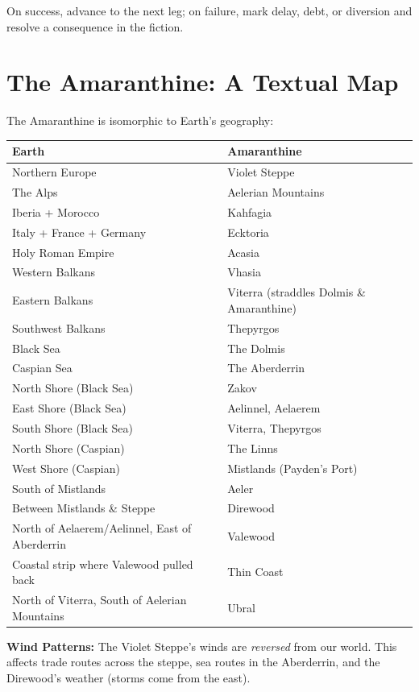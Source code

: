 \documentclass[11pt,letterpaper,twoside]{book}
\begin{document}
On success, advance to the next leg; on failure, mark delay, debt, or diversion and resolve a consequence in the fiction.

\section{The Amaranthine: A Textual Map}

The Amaranthine is isomorphic to Earth's geography:

\begin{center}
\begin{tabular}{|l|l|}
\hline
\textbf{Earth} & \textbf{Amaranthine} \\
\hline
Northern Europe & Violet Steppe \\
The Alps & Aelerian Mountains \\
Iberia + Morocco & Kahfagia \\
Italy + France + Germany & Ecktoria \\
Holy Roman Empire & Acasia \\
Western Balkans & Vhasia \\
Eastern Balkans & Viterra (straddles Dolmis \& Amaranthine) \\
Southwest Balkans & Thepyrgos \\
Black Sea & The Dolmis \\
Caspian Sea & The Aberderrin \\
North Shore (Black Sea) & Zakov \\
East Shore (Black Sea) & Aelinnel, Aelaerem \\
South Shore (Black Sea) & Viterra, Thepyrgos \\
North Shore (Caspian) & The Linns \\
West Shore (Caspian) & Mistlands (Payden's Port) \\
South of Mistlands & Aeler \\
Between Mistlands \& Steppe & Direwood \\
North of Aelaerem/Aelinnel, East of Aberderrin & Valewood \\
Coastal strip where Valewood pulled back & Thin Coast \\
North of Viterra, South of Aelerian Mountains & Ubral \\
\hline
\end{tabular}
\end{center}

\textbf{Wind Patterns:} The Violet Steppe's winds are \emph{reversed} from our world. This affects trade routes across the steppe, sea routes in the Aberderrin, and the Direwood's weather (storms come from the east).
\end{document}
